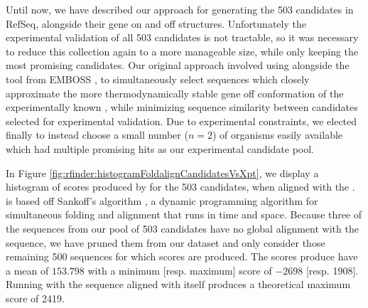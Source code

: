 Until now, we have described our approach for generating the 503 \grb candidates
in RefSeq, alongside their gene on and off structures. Unfortunately the
experimental validation of all 503 candidates is not tractable, so it was
necessary to reduce this collection again to a more manageable size, while only
keeping the most promising candidates. Our original approach involved using
\foldalign \citep{havgaard:2007ca} alongside the  tool from EMBOSS
\citep{rice:2000wr}, to simultaneously
select sequences which closely approximate the more thermodynamically stable
gene off conformation of the experimentally known \Bsxpt \grb, while minimizing
sequence similarity between candidates selected for experimental validation. Due to
experimental constraints, we elected finally to instead choose a small number
($n = 2$) of organisms easily available which had multiple promising hits as our
experimental candidate pool.

In Figure \ref{fig:rfinder:histogramFoldalignCandidatesVsXpt}, we display a histogram of scores produced
by \foldalign for the 503 candidates, when aligned with the \Bsxpt \grb. \foldalign
is based off Sankoff's algorithm \citep{sankoff:1985wc}, a dynamic programming
algorithm for simultaneous folding and alignment that runs in  time and
 space. Because three of the sequences from our pool of 503 candidates have
no global alignment with the \Bsxpt sequence, we have pruned them from our
dataset and only consider those remaining 500 sequences for which \foldalign
scores are produced. The \foldalign scores produce have a mean of $153.798$ with a
minimum [resp. maximum] score of $-2698$ [resp. 1908]. Running \foldalign with the
\Bsxpt sequence aligned with itself produces a theoretical maximum score of 2419.

